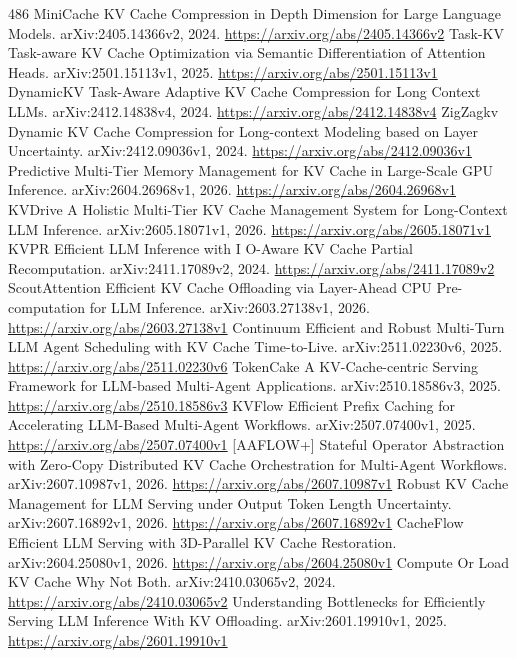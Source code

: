 \documentclass[11pt]{article}
\begin{document}
\begin{thebibliography}{486}
 MiniCache KV Cache Compression in Depth Dimension for Large Language Models. arXiv:2405.14366v2, 2024. \url{https://arxiv.org/abs/2405.14366v2}
 Task-KV Task-aware KV Cache Optimization via Semantic Differentiation of Attention Heads. arXiv:2501.15113v1, 2025. \url{https://arxiv.org/abs/2501.15113v1}
 DynamicKV Task-Aware Adaptive KV Cache Compression for Long Context LLMs. arXiv:2412.14838v4, 2024. \url{https://arxiv.org/abs/2412.14838v4}
 ZigZagkv Dynamic KV Cache Compression for Long-context Modeling based on Layer Uncertainty. arXiv:2412.09036v1, 2024. \url{https://arxiv.org/abs/2412.09036v1}
 Predictive Multi-Tier Memory Management for KV Cache in Large-Scale GPU Inference. arXiv:2604.26968v1, 2026. \url{https://arxiv.org/abs/2604.26968v1}
 KVDrive A Holistic Multi-Tier KV Cache Management System for Long-Context LLM Inference. arXiv:2605.18071v1, 2026. \url{https://arxiv.org/abs/2605.18071v1}
 KVPR Efficient LLM Inference with I O-Aware KV Cache Partial Recomputation. arXiv:2411.17089v2, 2024. \url{https://arxiv.org/abs/2411.17089v2}
 ScoutAttention Efficient KV Cache Offloading via Layer-Ahead CPU Pre-computation for LLM Inference. arXiv:2603.27138v1, 2026. \url{https://arxiv.org/abs/2603.27138v1}
 Continuum Efficient and Robust Multi-Turn LLM Agent Scheduling with KV Cache Time-to-Live. arXiv:2511.02230v6, 2025. \url{https://arxiv.org/abs/2511.02230v6}
 TokenCake A KV-Cache-centric Serving Framework for LLM-based Multi-Agent Applications. arXiv:2510.18586v3, 2025. \url{https://arxiv.org/abs/2510.18586v3}
 KVFlow Efficient Prefix Caching for Accelerating LLM-Based Multi-Agent Workflows. arXiv:2507.07400v1, 2025. \url{https://arxiv.org/abs/2507.07400v1}
 [AAFLOW+] Stateful Operator Abstraction with Zero-Copy Distributed KV Cache Orchestration for Multi-Agent Workflows. arXiv:2607.10987v1, 2026. \url{https://arxiv.org/abs/2607.10987v1}
 Robust KV Cache Management for LLM Serving under Output Token Length Uncertainty. arXiv:2607.16892v1, 2026. \url{https://arxiv.org/abs/2607.16892v1}
 CacheFlow Efficient LLM Serving with 3D-Parallel KV Cache Restoration. arXiv:2604.25080v1, 2026. \url{https://arxiv.org/abs/2604.25080v1}
 Compute Or Load KV Cache Why Not Both. arXiv:2410.03065v2, 2024. \url{https://arxiv.org/abs/2410.03065v2}
 Understanding Bottlenecks for Efficiently Serving LLM Inference With KV Offloading. arXiv:2601.19910v1, 2025. \url{https://arxiv.org/abs/2601.19910v1}

\end{thebibliography}
\end{document}
